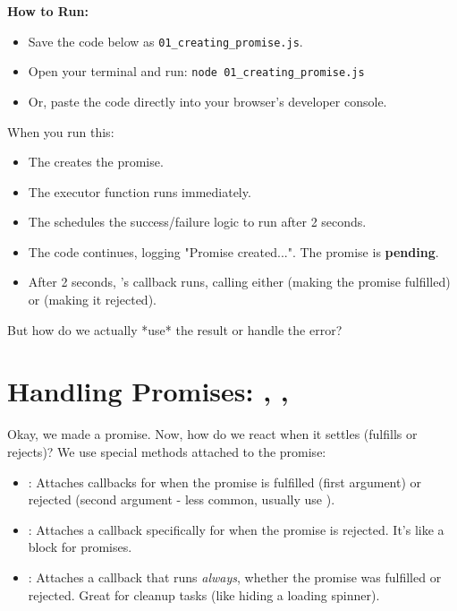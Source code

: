 \textbf{How to Run:}
\begin{itemize}
    \item Save the code below as \verb|01_creating_promise.js|.
    \item Open your terminal and run: \verb|node 01_creating_promise.js|
    \item Or, paste the code directly into your browser's developer console.
\end{itemize}

\begin{macterminal}
  
\end{macterminal}

When you run this:
\begin{itemize}
    \item The  creates the promise.
    \item The executor function  runs immediately.
    \item The  schedules the success/failure logic to run after 2 seconds.
    \item The code continues, logging "Promise created...". The promise is \textbf{pending}.
    \item After 2 seconds, 's callback runs, calling either  (making the promise fulfilled) or  (making it rejected).
\end{itemize}

But how do we actually *use* the result or handle the error?

\section{Handling Promises: , , }

Okay, we made a promise. Now, how do we react when it settles (fulfills or rejects)? We use special methods attached to the promise:

\begin{itemize}
    \item {}: Attaches callbacks for when the promise is fulfilled (first argument) or rejected (second argument - less common, usually use ).
    \item {}: Attaches a callback specifically for when the promise is rejected. It's like a  block for promises.
    \item {}: Attaches a callback that runs \textit{always}, whether the promise was fulfilled or rejected. Great for cleanup tasks (like hiding a loading spinner).
\end{itemize}

